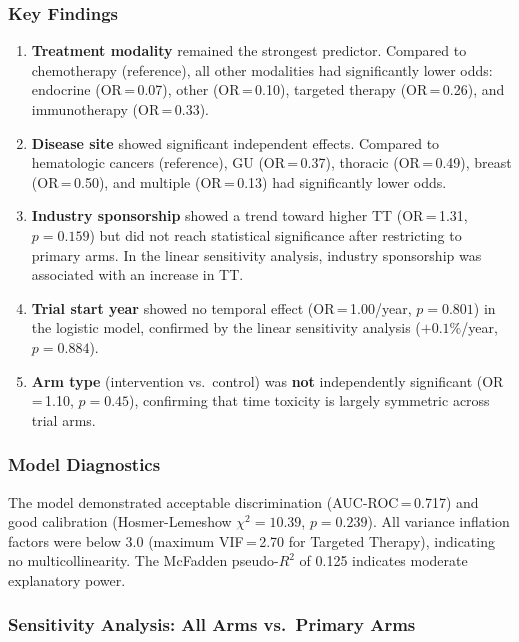 \documentclass[11pt,a4paper]{article}
\begin{document}
\subsubsection{Key Findings}

\begin{enumerate}
    \item \textbf{Treatment modality} remained the strongest predictor. Compared to chemotherapy (reference), all other modalities had significantly lower odds: endocrine (OR\,=\,0.07), other (OR\,=\,0.10), targeted therapy (OR\,=\,0.26), and immunotherapy (OR\,=\,0.33).

    \item \textbf{Disease site} showed significant independent effects. Compared to hematologic cancers (reference), GU (OR\,=\,0.37), thoracic (OR\,=\,0.49), breast (OR\,=\,0.50), and multiple (OR\,=\,0.13) had significantly lower odds.

    \item \textbf{Industry sponsorship} showed a trend toward higher TT (OR\,=\,1.31, $p=0.159$) but did not reach statistical significance after restricting to primary arms. In the linear sensitivity analysis, industry sponsorship was associated with an increase in TT.

    \item \textbf{Trial start year} showed no temporal effect (OR\,=\,1.00/year, $p=0.801$) in the logistic model, confirmed by the linear sensitivity analysis ($+0.1\%$/year, $p=0.884$).

    \item \textbf{Arm type} (intervention vs.\ control) was \textbf{not} independently significant (OR\,=\,1.10, $p=0.45$), confirming that time toxicity is largely symmetric across trial arms.
\end{enumerate}

\subsubsection{Model Diagnostics}

The model demonstrated acceptable discrimination (AUC-ROC\,=\,0.717) and good calibration (Hosmer-Lemeshow $\chi^2=10.39$, $p=0.239$). All variance inflation factors were below 3.0 (maximum VIF\,=\,2.70 for Targeted Therapy), indicating no multicollinearity. The McFadden pseudo-$R^2$ of 0.125 indicates moderate explanatory power.

\subsubsection{Sensitivity Analysis: All Arms vs.\ Primary Arms}
\end{document}
